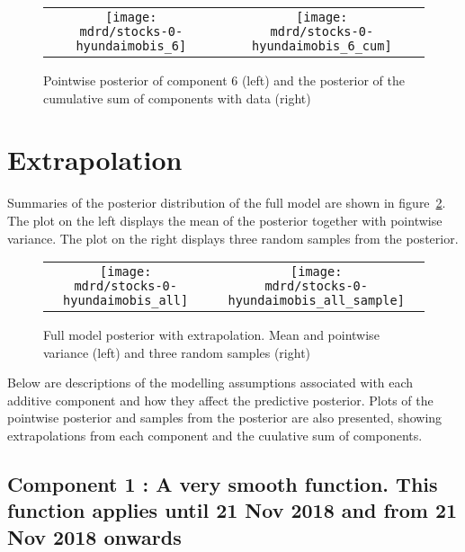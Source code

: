 \documentclass{article} %
\begin{document}
\begin{figure}[H]
\newcommand{\wmgd}{0.5\columnwidth}
\newcommand{\hmgd}{3.0cm}
\newcommand{\mdrd}{stocks-0-hyundaimobis}
\newcommand{\mbm}{\hspace{-0.3cm}}
\begin{tabular}{cc}
\mbm \texttt{[image: \\mdrd/stocks-0-hyundaimobis\_6]} & \texttt{[image: \\mdrd/stocks-0-hyundaimobis\_6\_cum]}
\end{tabular}
\caption{Pointwise posterior of component 6 (left) and the posterior of the cumulative sum of components with data (right)}
\label{fig:comp6}
\end{figure}

\section{Extrapolation}
\label{sec:extrap}

Summaries of the posterior distribution of the full model are shown in figure~\ref{fig:extrap}.
The plot on the left displays the mean of the posterior together with pointwise variance.
The plot on the right displays three random samples from the posterior.

\begin{figure}[H]
\newcommand{\wmgd}{0.5\columnwidth}
\newcommand{\hmgd}{3.0cm}
\newcommand{\mdrd}{stocks-0-hyundaimobis}
\newcommand{\mbm}{\hspace{-0.3cm}}
\begin{tabular}{cc}
\mbm \texttt{[image: \\mdrd/stocks-0-hyundaimobis\_all]} & \texttt{[image: \\mdrd/stocks-0-hyundaimobis\_all\_sample]}
\end{tabular}
\caption{Full model posterior with extrapolation. Mean and pointwise variance (left) and three random samples (right)}
\label{fig:extrap}
\end{figure}

Below are descriptions of the modelling assumptions associated with each additive component and how they affect the predictive posterior.
Plots of the pointwise posterior and samples from the posterior are also presented, showing extrapolations from each component and the cuulative sum of components.

\subsection{Component 1 : A very smooth function. This function applies until 21 Nov 2018 and from 21 Nov 2018 onwards}
\end{document}

